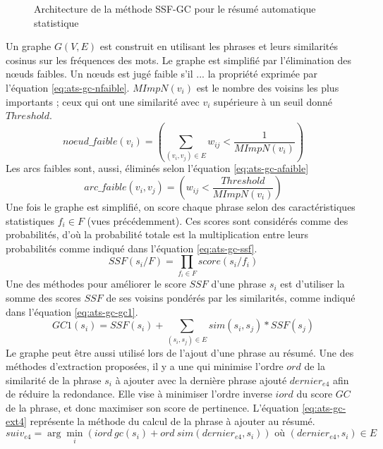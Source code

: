 \documentclass{KodeBook}
\begin{document}
\begin{figure}[!ht]
	\centering
	\caption{Architecture de la méthode SSF-GC pour le résumé automatique statistique \cite{21-aries-al}}
	\label{fig:ats-gc}
\end{figure}

Un graphe $G(V, E)$ est construit en utilisant les phrases et leurs similarités cosinus sur les fréquences des mots.
Le graphe est simplifié par l'élimination des nœuds faibles. 
Un nœuds est jugé faible s'il ... la propriété exprimée par l'équation \ref{eq:ats-gc-nfaible}.
$MImpN(v_i)$ est le nombre des voisins les plus importants ; ceux qui ont une similarité avec $v_i$ supérieure à un seuil donné $Threshold$.
\begin{equation}\label{eq:ats-gc-nfaible}
noeud\_faible(v_i) = ( \sum_{(v_i, v_j) \in E} w_{ij} < \frac{1}{MImpN(v_i)} )
\end{equation}
Les arcs faibles sont, aussi, éliminés selon l'équation \ref{eq:ats-gc-afaible}
\begin{equation}\label{eq:ats-gc-afaible}
arc\_faible(v_i, v_j) = ( w_{ij} < \frac{Threshold}{MImpN(v_i)})
\end{equation}
Une fois le graphe est simplifié, on score chaque phrase selon des caractéristiques statistiques $f_i \in F$ (vues précédemment). 
Ces scores sont considérés comme des probabilités, d'où la probabilité totale est la multiplication entre leurs probabilités comme indiqué dans l'équation \ref{eq:ats-gc-ssf}.
\begin{equation}\label{eq:ats-gc-ssf}
SSF(s_i/ F) = \prod_{f_i \in F} score(s_i/f_i)
\end{equation}
Une des méthodes pour améliorer le score $SSF$ d'une phrase $s_i$ est d'utiliser la somme des scores $SSF$ de ses voisins pondérés par les similarités, comme indiqué dans l'équation \ref{eq:ats-gc-gc1}.
\begin{equation}\label{eq:ats-gc-gc1}
GC1(s_i) = SSF(s_i) + \sum\limits_{(s_i, s_j) \in E} sim(s_i, s_j) * SSF(s_j)
\end{equation}
Le graphe peut être aussi utilisé lors de l'ajout d'une phrase au résumé. 
Une des méthodes d'extraction proposées, il y a une qui minimise l'ordre $ord$ de la similarité de la phrase $s_i$ à ajouter avec la dernière phrase ajouté $dernier_{e4}$ afin de réduire la redondance.
Elle vise à minimiser l'ordre inverse $iord$ du score $GC$ de la phrase, et donc maximiser son score de pertinence.
L'équation \ref{eq:ats-gc-ext4} représente la méthode du calcul de la phrase à ajouter au résumé.
\begin{equation}\label{eq:ats-gc-ext4}
suiv_{e4}  =  \arg\min\limits_i (iord\ gc(s_i) + ord\ sim(dernier_{e4}, s_i)) \text{ où } (dernier_{e4}, s_i) \in E
\end{equation}
\end{document}

